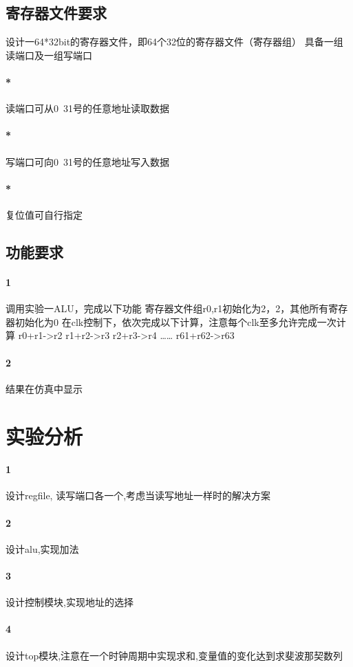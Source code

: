 \documentclass[UTF8]{ctexart}
\begin{document}
\subsection{寄存器文件要求}
设计一64*32bit的寄存器文件，即64个32位的寄存器文件（寄存器组）
具备一组读端口及一组写端口
\paragraph{*}读端口可从0~31号的任意地址读取数据
\paragraph{*}写端口可向0~31号的任意地址写入数据
\paragraph{*}复位值可自行指定

\subsection{功能要求}
\paragraph{1}调用实验一ALU，完成以下功能
寄存器文件组r0,r1初始化为2，2，其他所有寄存器初始化为0
在clk控制下，依次完成以下计算，注意每个clk至多允许完成一次计算
r0+r1->r2
r1+r2->r3
r2+r3->r4
……
r61+r62->r63
\paragraph{2}结果在仿真中显示

\section{实验分析}
\paragraph{1}设计regfile, 读写端口各一个,考虑当读写地址一样时的解决方案
\paragraph{2}设计alu,实现加法
\paragraph{3}设计控制模块,实现地址的选择
\paragraph{4}设计top模块,注意在一个时钟周期中实现求和,变量值的变化达到求斐波那契数列
\end{document}

